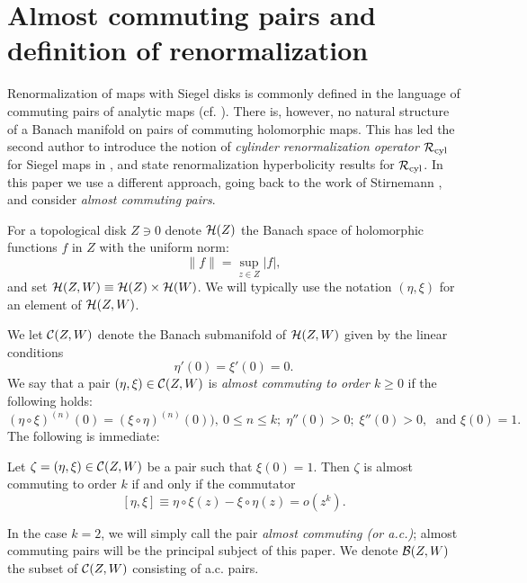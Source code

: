 \section{Almost commuting pairs and definition of renormalization}
\label{sec:symmetric}


Renormalization of maps with Siegel disks is commonly defined in the language of commuting pairs of analytic maps (cf. \cite{McM,Ya3}). There is, however, no natural structure of a Banach manifold on pairs of commuting holomorphic maps. This has led the second author to introduce the notion of {\it cylinder renormalization operator} $\mathcal{R}_{\text{cyl}}$ for Siegel maps in \cite{Ya3}, and state renormalization hyperbolicity results for $\mathcal{R}_{\text{cyl}}$. In this paper we use a different approach, going back to the work of Stirnemann \cite{Stir}, and consider {\it almost commuting pairs}. 

For a topological disk $Z\ni 0$ denote $\mathcal{H}(Z)$ the Banach space of holomorphic functions $f$ in $Z$ with the uniform norm:
\begin{equation}
\label{eq:unorm1}\| f\|=\sup_{z \in Z} |f|,
\end{equation}
and set $\mathcal{H}(Z,W)\equiv \mathcal{H}(Z)\times\mathcal{H}(W)$.
We will typically use the notation $(\eta,\xi)$ for an element of $\mathcal{H}(Z,W)$.

We let $\mathcal{C}(Z,W)$ denote the Banach submanifold of $\mathcal{H}(Z,W)$ given by the linear conditions 
$$\eta'(0)=\xi'(0)=0.$$
We say that a pair $(\eta,\xi)\in\mathcal{C}(Z,W)$ is  {\it almost commuting to order $k\geq 0$} if the following holds:  
\begin{equation}\label{eq:accond}
(\eta \circ \xi)^{(n)}(0)=(\xi \circ \eta)^{(n)}(0)), \ 0\leq n\leq k;\; \eta''(0)>0;\;\xi''(0)>0,\;\text{ and }\xi(0)=1.
\end{equation}
The following is immediate:
\begin{prop}
Let $\zeta=(\eta,\xi)\in\mathcal{C}(Z,W)$ be a pair such that $\xi(0)=1$. Then $\zeta$ is almost commuting to order $k$ if and only if the commutator 
\begin{equation}\label{eq:commutator}
[\eta,\xi]\equiv \eta\circ \xi(z)-\xi\circ\eta(z)=o(z^k).
\end{equation}
\end{prop}


In the case $k=2$, we will simply call the pair {\it almost commuting (or a.c.)}; almost commuting pairs will be the principal subject of this paper.
We denote $\mathcal{B}(Z,W)$ the subset of $\mathcal{C}(Z,W)$ consisting of a.c. pairs.  

